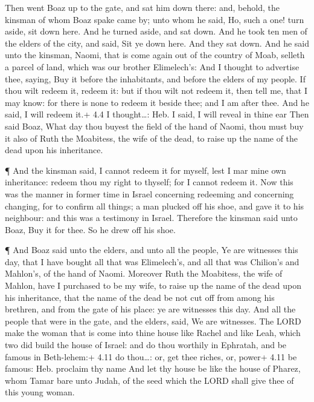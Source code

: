  Then went Boaz up to the gate, and sat him down there: and,
behold, the kinsman of whom Boaz spake came by; unto whom he said, Ho,
such a one! turn aside, sit down here. And he turned aside, and sat
down.  And he took ten men of the elders of the city, and
said, Sit ye down here. And they sat down.  And he said unto
the kinsman, Naomi, that is come again out of the country of Moab,
selleth a parcel of land, which was our brother Elimelech's:
 And I thought to advertise thee, saying, Buy it before the
inhabitants, and before the elders of my people. If thou wilt redeem it,
redeem it: but if thou wilt not redeem it, then tell me, that I may
know: for there is none to redeem it beside thee; and I am after thee.
And he said, I will redeem it.+ 4.4 I thought\ldots: Heb. I said, I will
reveal in thine ear  Then said Boaz, What day thou buyest
the field of the hand of Naomi, thou must buy it also of Ruth the
Moabitess, the wife of the dead, to raise up the name of the dead upon
his inheritance.

 ¶ And the kinsman said, I cannot redeem it for myself, lest
I mar mine own inheritance: redeem thou my right to thyself; for I
cannot redeem it.  Now this was the manner in former time in
Israel concerning redeeming and concerning changing, for to confirm all
things; a man plucked off his shoe, and gave it to his neighbour: and
this was a testimony in Israel.  Therefore the kinsman said
unto Boaz, Buy it for thee. So he drew off his shoe.

 ¶ And Boaz said unto the elders, and unto all the people,
Ye are witnesses this day, that I have bought all that was Elimelech's,
and all that was Chilion's and Mahlon's, of the hand of Naomi.
 Moreover Ruth the Moabitess, the wife of Mahlon, have I
purchased to be my wife, to raise up the name of the dead upon his
inheritance, that the name of the dead be not cut off from among his
brethren, and from the gate of his place: ye are witnesses this day.
 And all the people that were in the gate, and the elders,
said, We are witnesses. The LORD make the woman that is come into thine
house like Rachel and like Leah, which two did build the house of
Israel: and do thou worthily in Ephratah, and be famous in Beth-lehem:+
4.11 do thou\ldots: or, get thee riches, or, power+ 4.11 be famous: Heb.
proclaim thy name  And let thy house be like the house of
Pharez, whom Tamar bare unto Judah, of the seed which the LORD shall
give thee of this young woman.

